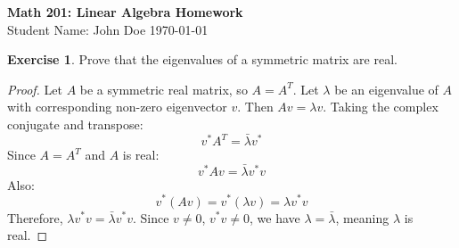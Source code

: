 \documentclass[12pt,a4paper]{article}
\theoremstyle{definition}
\newtheorem{ex}{Exercise}
\begin{document}
\begin{center}
    {\Large \bfseries Math 201: Linear Algebra Homework} \\
    Student Name: John Doe \hfill \today
\end{center}

\hr
\vspace{0.5cm}

\begin{ex}
Prove that the eigenvalues of a symmetric matrix are real.
\end{ex}

\begin{proof}
Let $A$ be a symmetric real matrix, so $A = A^T$.
Let $\lambda$ be an eigenvalue of $A$ with corresponding non-zero eigenvector $v$. Then $A v = \lambda v$.
Taking the complex conjugate and transpose:
\begin{equation*}
    v^* A^T = \bar{\lambda} v^*
\end{equation*}
Since $A = A^T$ and $A$ is real:
\begin{equation*}
    v^* A v = \bar{\lambda} v^* v
\end{equation*}
Also:
\begin{equation*}
    v^* (A v) = v^* (\lambda v) = \lambda v^* v
\end{equation*}
Therefore, $\lambda v^* v = \bar{\lambda} v^* v$. Since $v \neq 0$, $v^* v \neq 0$, we have $\lambda = \bar{\lambda}$, meaning $\lambda$ is real.
\end{proof}
\end{document}
